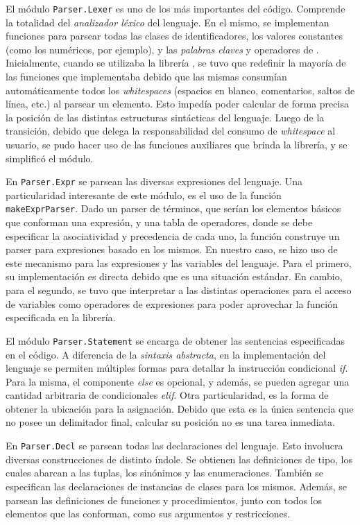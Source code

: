 El módulo \lstinline[style = haskell]{Parser.Lexer} es uno de los más importantes del código.
Comprende la totalidad del \textit{analizador léxico} del lenguaje.
En el mismo, se implementan funciones para parsear todas las clases de identificadores, los valores constantes (como los numéricos, por ejemplo), y las \textit{palabras claves} y operadores de \Lenguaje{}.
Inicialmente, cuando se utilizaba la librería \Parsec{}, se tuvo que redefinir la mayoría de las funciones que implementaba debido que las mismas consumían automáticamente todos los \textit{whitespaces} (espacios en blanco, comentarios, saltos de línea, etc.) al parsear un elemento.
Esto impedía poder calcular de forma precisa la posición de las distintas estructuras sintácticas del lenguaje.
Luego de la transición, debido que \Megaparsec{} delega la responsabilidad del consumo de \textit{whitespace} al usuario, se pudo hacer uso de las funciones auxiliares que brinda la librería, y se simplificó el módulo.

En \lstinline[style = haskell]{Parser.Expr} se parsean las diversas expresiones del lenguaje.
Una particularidad interesante de este módulo, es el uso de la función \lstinline[style = haskell]{makeExprParser}.
Dado un parser de términos, que serían los elementos básicos que conforman una expresión, y una tabla de operadores, donde se debe especificar la asociatividad y precedencia de cada uno, la función construye un parser para expresiones basado en los mismos.
En nuestro caso, se hizo uso de este mecanismo para las expresiones y las variables del lenguaje.
Para el primero, su implementación es directa debido que es una situación estándar.
En cambio, para el segundo, se tuvo que interpretar a las distintas operaciones para el acceso de variables como operadores de expresiones para poder aprovechar la función especificada en la librería.

El módulo \lstinline[style = haskell]{Parser.Statement} se encarga de obtener las sentencias especificadas en el código.
A diferencia de la \textit{sintaxis abstracta}, en la implementación del lenguaje se permiten múltiples formas para detallar la instrucción condicional \textit{if}.
Para la misma, el componente \textit{else} es opcional, y además, se pueden agregar una cantidad arbitraria de condicionales \textit{elif}.
Otra particularidad, es la forma de obtener la ubicación para la asignación.
Debido que esta es la única sentencia que no posee un delimitador final, calcular su posición no es una tarea inmediata.

En \lstinline[style = haskell]{Parser.Decl} se parsean todas las declaraciones del lenguaje.
Esto involucra diversas construcciones de distinto índole.
Se obtienen las definiciones de tipo, los cuales abarcan a las tuplas, los sinónimos y las enumeraciones.
También se especifican las declaraciones de instancias de clases para los mismos.
Además, se parsean las definiciones de funciones y procedimientos, junto con todos los elementos que las conforman, como sus argumentos y restricciones.

